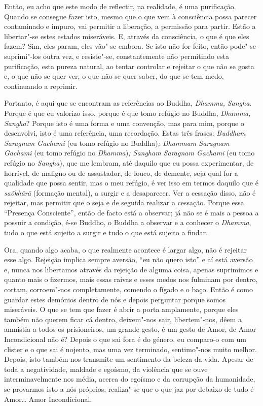 Então, eu acho que este modo de reflectir, na realidade, é uma
purificação. Quando se consegue fazer isto, mesmo que o que vem à
consciência possa parecer contaminado e impuro, vai permitir a
liberação, a permissão para partir. Estão a libertar"-se estes estados
miseráveis. E, através da consciência, o que é que eles fazem? Sim, eles
param, eles vão"-se embora. Se isto não for feito, então pode"-se
suprimi"-los outra vez, e resiste"-se, constantemente não permitindo esta
purificação, esta pureza natural, ao tentar controlar e rejeitar o que
não se gosta e, o que não se quer ver, o que não se quer saber, do que
se tem medo, continuando a reprimir.

Portanto, é aqui que se encontram as referências ao Buddha,
\emph{Dhamma,} \emph{Sangha}. Porque é que eu valorizo isso, porque é
que tomo refúgio no Buddha, \emph{Dhamma,} \emph{Sangha}? Porque isto é
uma forma e uma convenção, mas para mim, porque o desenvolvi, isto é uma
referência, uma recordação. Estas três frases: \emph{Buddham Saragnam
Gachami} (eu tomo refúgio no Buddha)\emph{; Dhammam Saragnam Gachami}
(eu tomo refúgio no \emph{Dhamma})\emph{; Sangham Saragnam Gachami} (eu
tomo refúgio no \emph{Sangha}), que me lembram, até daquilo que eu possa
experimentar, de horrível, de maligno ou de assustador, de louco, de
demente, seja qual for a qualidade que possa sentir, mas o meu refúgio,
é ver isso em termos daquilo que é \emph{saõkhārā} (formação mental), a
surgir e a desaparecer. Ver a cessação disso, não é rejeitar, mas
permitir que o seja e de seguida realizar a cessação. Porque essa
``Presença Consciente'', então de facto está a observar; já não se é
mais a pessoa a possuir a condição, é-se Buddho, o Buddha a observar e a
conhecer o \emph{Dhamma}, tudo o que está sujeito a surgir e tudo o que
está sujeito a findar.

Ora, quando algo acaba, o que realmente acontece é largar algo, não é
rejeitar esse algo. Rejeição implica sempre aversão, ``eu não quero
isto'' e aí está aversão e, nunca nos libertamos através da rejeição de
alguma coisa, apenas suprimimos e quanto mais o fizermos, mais essas
raivas e esses medos nos fulminam por dentro, cortam, corroem"-nos
completamente, comendo o fígado e o baço. Então é como guardar estes
demónios dentro de nós e depois perguntar porque somos miseráveis. O que
se tem que fazer é abrir a porta amplamente, porque eles também não
querem ficar cá dentro, deixem"-nos sair, libertem"-nos, dêem a amnistia a
todos os prisioneiros, um grande gesto, é um gesto de Amor, de Amor
Incondicional não é? Depois o que sai fora é do género, eu comparo-o com
um clister e o que sai é nojento, mas uma vez terminado, sentimo"-nos
muito melhor. Depois, isto também nos transmite um sentimento da beleza
da vida. Apesar de toda a negatividade, maldade e egoísmo, da violência
que se ouve interminavelmente nos média, acerca do egoísmo e da
corrupção da humanidade, se provarmos isto a nós próprios, realiza"-se
que o que jaz por debaixo de tudo é Amor\ldots{} Amor Incondicional.

